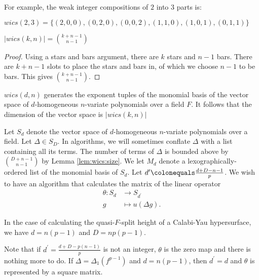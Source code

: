 For example, the weak integer compositions of $2$ into $3$ parts is:
\begin{center}
    $wics(2, 3) = \lbrace (2, 0, 0), (0, 2, 0), (0, 0, 2), (1, 1, 0), (1, 0, 1), (0, 1, 1) \rbrace$
\end{center}

\begin{lem}
    \label{lem:wics:size}
    $|wics(k, n)| = \binom{k + n - 1}{n - 1}$
\end{lem}

\begin{proof}
    Using a stars and bars argument, there are $k$ stars and $n - 1$ bars. There are $k + n - 1$ slots to place the stars and bars in, of which we choose $n - 1$ to be bars.
    This gives $\binom{k + n - 1}{n - 1}$.
\end{proof}

\begin{rmk}
    $wics(d, n)$ generates the exponent tuples of the monomial basis of the vector space of $d$-homogeneous $n$-variate polynomials over a field $F$.
    It follows that the dimension of the vector space is $|wics(k, n)|$
\end{rmk}

\begin{cxt}
	\label{cxt:mult:split}
	Let $S_d$ denote the vector space of $d$-homogeneous $n$-variate polynomials over a field.
    Let \(\Delta \in S_D\).
	In algorithms, we will sometimes conflate \(\Delta\) 
	with a list containing all its terms.
	The number of terms of \(\Delta\) is bounded 
	above by \(\binom{D+n-1}{n-1}\) by Lemma \ref{lem:wics:size}.
	We let \(M_{d}\) denote a lexographically-ordered list
	of the monomial basis of \(S_{d}\).
	Let \(d^{\prime} \colonequals \frac{d+D-n-1}{p}\).
	We wish to have an algorithm that calculates the matrix of
	the linear operator
	\begin{align*}
		\theta : S_{d} &\longrightarrow S_{d^{\prime}} \\
		g &\longmapsto u(\Delta g)
	.\end{align*}
\end{cxt}

In the case of calculating the quasi-\(F\)-split height of a Calabi-Yau
hypersurface,
we have \(d = n(p-1)\) and \(D = np(p-1)\).

\begin{rmk}
	Note that if  \(d^{\prime} = \frac{d+D-p(n-1)}{p}\)
	is not an integer, \(\theta\) is the zero map
	and there is nothing more to do. 
    If \(\Delta = \Delta_{1}(f^{p-1})\) and \(d = n(p-1)\),
	then \(d^{\prime} = d\) and \(\theta\) is
	represented by
	a square matrix.
\end{rmk}

